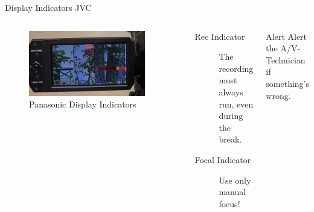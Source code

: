 \documentclass[aspectratio=169]{beamer}
\begin{document}
\begin{frame}{Display Indicators JVC}
	\begin{columns}[T,onlytextwidth]
	\begin{figure} 
		\centering
		\includegraphics[width=0.9\textwidth]{images/jvc_display_description.png}
		\caption{Panasonic Display Indicators}
	\end{figure}
		\begin{description}
			\item[Rec Indicator] The recording must always run, even during the break.
			\item[Focal Indicator] Use only manual focus!
		\end{description}
		\begin{alertblock}{Alert}
			Alert the A/V-Technician if something's wrong.
		\end{alertblock}
	\end{columns}
\end{frame}
\end{document}
